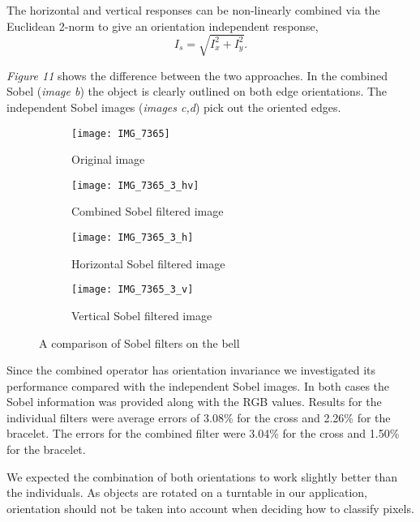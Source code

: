 \documentclass[12pt]{IIBproject}
\begin{document}
 
 
 The horizontal and vertical responses can be non-linearly combined via the
Euclidean 2-norm to give an orientation independent response,
\begin{equation}
I_s = \sqrt{I_x^2 + I_y^2} .
\end{equation} 
 
 \emph{Figure 11} shows the difference between the two approaches. In the combined Sobel (\emph{image b}) the object is clearly outlined on both edge orientations. The independent Sobel images (\emph{images c,d}) pick out the oriented edges. 


\begin{figure}[H]
\centering
\begin{subfigure}{.45\textwidth}
  \centering
  \texttt{[image: IMG\_7365]}
  \caption{Original image}
  \label{fig:sub1}
\end{subfigure}%
\begin{subfigure}{.45\textwidth}
  \centering
  \texttt{[image: IMG\_7365\_3\_hv]}
  \caption{Combined Sobel filtered image}
  \label{fig:sub2}
\end{subfigure}
\begin{subfigure}{.45\textwidth}
  \centering
  \texttt{[image: IMG\_7365\_3\_h]}
  \caption{Horizontal Sobel filtered image}
  \label{fig:sub2}
\end{subfigure}
\begin{subfigure}{.45\textwidth}
  \centering
  \texttt{[image: IMG\_7365\_3\_v]}
  \caption{Vertical Sobel filtered image}
  \label{fig:sub2}
\end{subfigure}
\caption{A comparison of Sobel filters on the bell}
\label{fig:test}
\end{figure}


Since the combined operator has orientation invariance we investigated its performance compared with the independent Sobel images. In both cases the Sobel information was provided along with the RGB values. Results for the individual filters were average errors of 3.08\% for the cross and 2.26\% for the bracelet. The errors for the combined filter were 3.04\% for the cross and 1.50\% for the bracelet. 

We expected the combination of both orientations to work slightly better than the individuals. As objects are rotated on a turntable in our application, orientation should not be taken into account when deciding how to classify pixels. 
\end{document}
